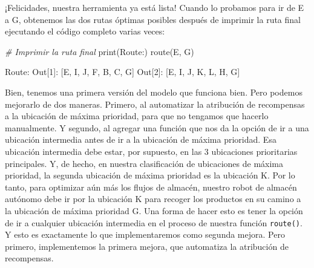 \documentclass[
]{book}
\newenvironment{Shaded}{\begin{snugshade}}{\end{snugshade}}
\newcommand{\BuiltInTok}[1]{#1}
\newcommand{\CommentTok}[1]{\textcolor[rgb]{0.56,0.35,0.01}{\textit{#1}}}
\newcommand{\DecValTok}[1]{\textcolor[rgb]{0.00,0.00,0.81}{#1}}
\newcommand{\NormalTok}[1]{#1}
\newcommand{\StringTok}[1]{\textcolor[rgb]{0.31,0.60,0.02}{#1}}
\begin{document}
¡Felicidades, nuestra herramienta ya está lista! Cuando lo probamos para ir de E a G, obtenemos las dos rutas óptimas posibles después de imprimir la ruta final ejecutando el código completo varias veces:

\begin{Shaded}
\begin{Highlighting}[]
\CommentTok{\# Imprimir la ruta final}
\BuiltInTok{print}\NormalTok{(}\StringTok{\textquotesingle{}Route:\textquotesingle{}}\NormalTok{)}
\NormalTok{route(}\StringTok{\textquotesingle{}E\textquotesingle{}}\NormalTok{, }\StringTok{\textquotesingle{}G\textquotesingle{}}\NormalTok{)}
\end{Highlighting}
\end{Shaded}

\begin{Shaded}
\begin{Highlighting}[]
\NormalTok{Route:}
\NormalTok{Out[}\DecValTok{1}\NormalTok{]: [}\StringTok{\textquotesingle{}E\textquotesingle{}}\NormalTok{, }\StringTok{\textquotesingle{}I\textquotesingle{}}\NormalTok{, }\StringTok{\textquotesingle{}J\textquotesingle{}}\NormalTok{, }\StringTok{\textquotesingle{}F\textquotesingle{}}\NormalTok{, }\StringTok{\textquotesingle{}B\textquotesingle{}}\NormalTok{, }\StringTok{\textquotesingle{}C\textquotesingle{}}\NormalTok{, }\StringTok{\textquotesingle{}G\textquotesingle{}}\NormalTok{]}
\NormalTok{Out[}\DecValTok{2}\NormalTok{]: [}\StringTok{\textquotesingle{}E\textquotesingle{}}\NormalTok{, }\StringTok{\textquotesingle{}I\textquotesingle{}}\NormalTok{, }\StringTok{\textquotesingle{}J\textquotesingle{}}\NormalTok{, }\StringTok{\textquotesingle{}K\textquotesingle{}}\NormalTok{, }\StringTok{\textquotesingle{}L\textquotesingle{}}\NormalTok{, }\StringTok{\textquotesingle{}H\textquotesingle{}}\NormalTok{, }\StringTok{\textquotesingle{}G\textquotesingle{}}\NormalTok{]}
\end{Highlighting}
\end{Shaded}

Bien, tenemos una primera versión del modelo que funciona bien. Pero podemos mejorarlo de dos maneras. Primero, al automatizar la atribución de recompensas a la ubicación de máxima prioridad, para que no tengamos que hacerlo manualmente. Y segundo, al agregar una función que nos da la opción de ir a una ubicación intermedia antes de ir a la ubicación de máxima prioridad. Esa ubicación intermedia debe estar, por supuesto, en las 3 ubicaciones prioritarias principales. Y, de hecho, en nuestra clasificación de ubicaciones de máxima prioridad, la segunda ubicación de máxima prioridad es la ubicación K. Por lo tanto, para optimizar aún más los flujos de almacén, nuestro robot de almacén autónomo debe ir por la ubicación K para recoger los productos en su camino a la ubicación de máxima prioridad G. Una forma de hacer esto es tener la opción de ir a cualquier ubicación intermedia en el proceso de nuestra función \texttt{route()}. Y esto es exactamente lo que implementaremos como segunda mejora. Pero primero, implementemos la primera mejora, que automatiza la atribución de recompensas.
\end{document}
